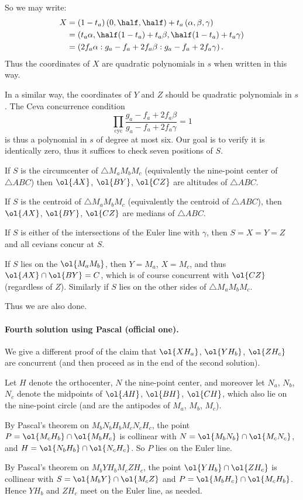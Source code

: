 \documentclass[11pt]{scrartcl}
\begin{document}
So we may write:
\begin{align*}
  X &= (1-t_a) \left( 0, \half, \half \right)
    + t_a \left( \alpha, \beta, \gamma \right) \\
  &= \left( t_a \alpha, \half(1-t_a) + t_a \beta,
    \half(1-t_a) + t_a \gamma \right) \\
  &= \left( 2f_a \alpha : g_a - f_a + 2f_a \beta : g_a - f_a + 2 f_a \gamma \right).
\end{align*}
Thus the coordinates of $X$ are quadratic polynomials in $s$
when written in this way.

In a similar way, the coordinates of $Y$ and $Z$
should be quadratic polynomials in $s$.
The Ceva concurrence condition
\[ \prod_{\text{cyc}} \frac{g_a-f_a+2f_a\beta}{g_a-f_a+2f_a\gamma}
  = 1 \]
is thus a polynomial in $s$ of degree at most six.
Our goal is to verify it is identically zero,
thus it suffices to check seven positions of $S$.

\begin{itemize}
  \ii If $S$ is the circumcenter of $\triangle M_a M_b M_c$
  (equivalently the nine-point center of $\triangle ABC$)
  then $\ol{AX}$, $\ol{BY}$, $\ol{CZ}$
  are altitudes of $\triangle ABC$.

  \ii If $S$ is the centroid of $\triangle M_a M_b M_c$
  (equivalently the centroid of $\triangle ABC$),
  then $\ol{AX}$, $\ol{BY}$, $\ol{CZ}$
  are medians of $\triangle ABC$.

  \ii If $S$ is either of the intersections of the Euler
  line with $\gamma$, then $S = X = Y = Z$
  and all cevians concur at $S$.

  \ii If $S$ lies on the $\ol{M_a M_b}$,
  then $Y = M_a$, $X = M_c$, and thus $\ol{AX} \cap \ol{BY} = C$,
  which is of course concurrent with $\ol{CZ}$
  (regardless of $Z$).
  Similarly if $S$ lies on the other sides of $\triangle M_a M_b M_c$.
\end{itemize}
Thus we are also done.

\paragraph{Fourth solution using Pascal (official one).}
We give a different proof of the claim that
$\ol{XH_a}$, $\ol{YH_b}$, $\ol{ZH_c}$ are concurrent
(and then proceed as in the end of the second solution).

Let $H$ denote the orthocenter, $N$ the nine-point center,
and moreover let $N_a$, $N_b$, $N_c$ denote the midpoints
of $\ol{AH}$, $\ol{BH}$, $\ol{CH}$,
which also lie on the nine-point circle
(and are the antipodes of $M_a$, $M_b$, $M_c$).
\begin{itemize}
  \ii By Pascal's theorem on $M_b N_b H_b M_c N_c H_c$,
  the point $P = \ol{M_c H_b} \cap \ol{M_b H_c}$
  is collinear with $N = \ol{M_b N_b} \cap \ol{M_c N_c}$,
  and $H = \ol{N_b H_b} \cap \ol{N_c H_c}$.
  So $P$ lies on the Euler line.

  \ii By Pascal's theorem on $M_b Y H_b M_c Z H_c$,
  the point $\ol{YH_b} \cap \ol{ZH_c}$ is collinear
  with $S = \ol{M_b Y} \cap \ol{M_c Z}$
  and $P = \ol{M_b H_c} \cap \ol{M_c H_b}$.
  Hence $YH_b$ and $ZH_c$ meet on the Euler line, as needed.
\end{itemize}
\pagebreak
\end{document}
